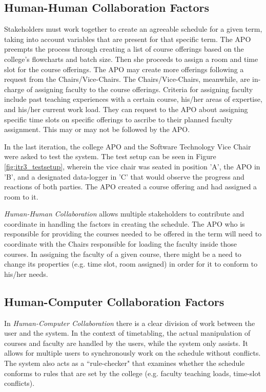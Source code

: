 \subsection{Human-Human Collaboration Factors}
Stakeholders must work together to create an agreeable schedule for a given term, taking into account variables that are present for that specific term. The APO preempts the process through creating a list of course offerings based on the college's flowcharts and batch size. Then she proceeds to assign a room and time slot for the course offerings. The APO may create more offerings following a request from the Chairs/Vice-Chairs. The Chairs/Vice-Chairs, meanwhile, are in-charge of assigning faculty to the course offerings. Criteria for assigning faculty include past teaching experiences with a certain course, his/her areas of expertise, and his/her current work load. They can request to the APO about assigning specific time slots on specific offerings to ascribe to their planned faculty assignment. This may or may not be followed by the APO.

In the last iteration, the college APO and the Software Technology Vice Chair were asked to test the system. The test setup can be seen in Figure \ref{fig:itr3_testsetup}, wherein the vice chair was seated in position 'A', the APO in 'B', and a designated data-logger in 'C' that would observe the progress and reactions of both parties. The APO created a course offering and had assigned a room to it. 

\textit{Human-Human Collaboration} allows multiple stakeholders to contribute and coordinate in handling the factors in creating the schedule. The APO who is responsible for providing the courses needed to be offered in the term will need to coordinate with the Chairs responsible for loading the faculty inside those courses. In assigning the faculty of a given course, there might be a need to change its properties (e.g. time slot, room assigned) in order for it to conform to his/her needs.


\subsection{Human-Computer Collaboration Factors}

In \textit{Human-Computer Collaboration} there is a clear division of work between the user and the system. In the context of timetabling, the actual manipulation of courses and faculty are handled by the users, while the system only assists. It allows for multiple users to synchronously work on the schedule without conflicts. The system also acts as a ``rule-checker" that examines whether the schedule conforms to rules that are set by the college (e.g. faculty teaching loads, time-slot conflicts).  

